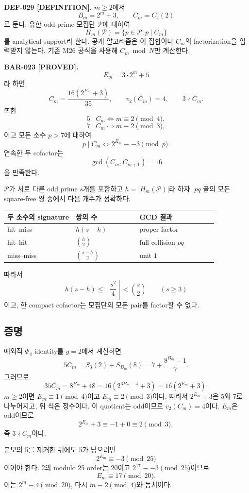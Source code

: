 \documentclass[11pt]{article}
\begin{document}
\textbf{DEF-029 [DEFINITION].}
\(m\ge2\)에서
\[
B_m=2^m+3,\qquad C_m=C_4(2)
\]
로 둔다. 유한 odd-prime 모집단 \(\mathcal P\)에 대하여
\[
H_m(\mathcal P)=\{p\in\mathcal P:p\mid C_m\}
\]
를 analytical support라 한다. 공개 알고리즘은 이 집합이나
\(C_m\)의 factorization을 입력받지 않는다. 기존 M26 공식을 사용해
\(C_m\bmod N\)만 계산한다.

\textbf{BAR-023 [PROVED].}
\[
E_m=3\cdot2^m+5
\]
라 하면
\[
C_m=\frac{16(2^{E_m}+3)}{35},\qquad
v_2(C_m)=4,\qquad 3\nmid C_m.
\]
또한
\[
5\mid C_m\Longleftrightarrow m\equiv2\pmod4,
\]
\[
7\mid C_m\Longleftrightarrow m\equiv2\pmod3,
\]
이고 모든 소수 \(p>7\)에 대하여
\[
p\mid C_m\Longleftrightarrow2^{E_m}\equiv-3\pmod p.
\]
연속한 두 cofactor는
\[
\gcd(C_m,C_{m+1})=16
\]
을 만족한다.

\(\mathcal P\)가 서로 다른 odd prime \(s\)개를 포함하고
\(h=|H_m(\mathcal P)|\)라 하자. \(pq\) 꼴의 모든 square-free 쌍
중에서 다음 개수가 정확하다.

\begin{center}
\begin{tabular}{L{0.28\linewidth}L{0.26\linewidth}L{0.32\linewidth}}
\toprule
두 소수의 signature & 쌍의 수 & GCD 결과 \\
\midrule
hit--miss & \(h(s-h)\) & proper factor \\
hit--hit & \(\binom h2\) & full collision \(pq\) \\
miss--miss & \(\binom{s-h}{2}\) & unit \(1\) \\
\bottomrule
\end{tabular}
\end{center}

따라서
\[
h(s-h)\le\left\lfloor\frac{s^2}{4}\right\rfloor
<\binom{s}{2}\qquad(s\ge3)
\]
이고, 한 compact cofactor는 모집단의 모든 pair를 factor할 수 없다.

\subsection{증명}

예외적 \(\Phi_4\) identity를 \(g=2\)에서 계산하면
\[
5C_m=S_3(2)+S_{B_m}(8)
=7+\frac{8^{B_m}-1}{7}.
\]
그러므로
\[
35C_m=8^{B_m}+48
=16(2^{3B_m-4}+3)
=16(2^{E_m}+3).
\]
\(m\ge2\)이면 \(E_m\equiv1\pmod4\)이고
\(E_m\equiv2\pmod3\)이다. 따라서 \(2^{E_m}+3\)은 5와 7로 나누어지고,
위 식은 정수이다. 이 quotient는 odd이므로 \(v_2(C_m)=4\)이다.
\(E_m\)은 odd이므로
\[
2^{E_m}+3\equiv-1+0\equiv2\pmod3,
\]
즉 \(3\nmid C_m\)이다.

분모의 5를 제거한 뒤에도 5가 남으려면
\[
2^{E_m}\equiv-3\pmod{25}
\]
이어야 한다. 2의 modulo 25 order는 20이고
\(2^{17}\equiv-3\pmod{25}\)이므로
\[
E_m\equiv17\pmod{20}.
\]
이는 \(2^m\equiv4\pmod{20}\), 다시
\(m\equiv2\pmod4\)와 동치이다.
\end{document}
